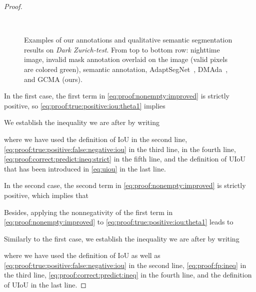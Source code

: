 \documentclass[10pt,twocolumn,letterpaper]{article}
\begin{document}
\begin{proof}
\begin{figure*}[!tb]
    \hfil
    \hfil
    \hfil
    \hfil
    \\
    \vspace{-0.3cm}
    \hfil
    \hfil
    \hfil
    \hfil
    \caption{Examples of our annotations and qualitative semantic segmentation results on \emph{Dark Zurich-test}. From top to bottom row: nighttime image, invalid mask annotation overlaid on the image (valid pixels are colored green), semantic annotation, AdaptSegNet~\cite{adapt:structured:output:cvpr18}, DMAda~\cite{daytime:2:nighttime}, and GCMA (ours).}
    \label{fig:sem:seg:extra}
\end{figure*}

In the first case, the first term in \eqref{eq:proof:nonempty:improved} is strictly positive, so \eqref{eq:proof:true:positive:iou:theta1} implies

We establish the inequality we are after by writing

where we have used the definition of IoU in the second line, \eqref{eq:proof:true:positive:false:negative:iou} in the third line,  in the fourth line, \eqref{eq:proof:correct:predict:ineq:strict} in the fifth line, and the definition of UIoU that has been introduced in \eqref{eq:uiou} in the last line.

In the second case, the second term in \eqref{eq:proof:nonempty:improved} is strictly positive, which implies that

Besides, applying the nonnegativity of the first term in \eqref{eq:proof:nonempty:improved} to \eqref{eq:proof:true:positive:iou:theta1} leads to

Similarly to the first case, we establish the inequality we are after by writing

where we have used the definition of IoU as well as \eqref{eq:proof:true:positive:false:negative:iou} in the second line, \eqref{eq:proof:fp:ineq} in the third line, \eqref{eq:proof:correct:predict:ineq} in the fourth line, and the definition of UIoU in the last line.
\end{proof}
\end{document}
